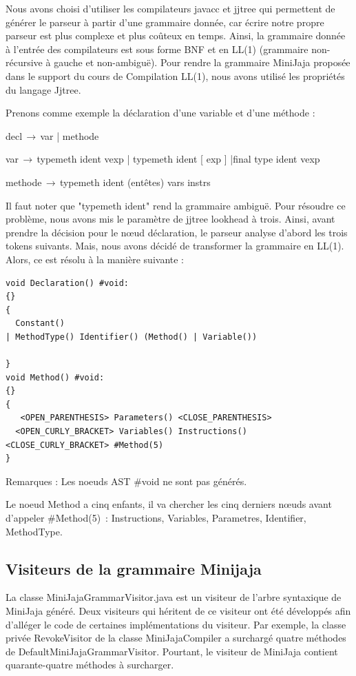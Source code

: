 \documentclass[a4paper,12pt]{report}
\begin{document}
Nous avons choisi d’utiliser les compilateurs javacc et jjtree qui permettent de générer le parseur à partir d'une grammaire donnée, car écrire notre propre parseur est plus complexe et plus coûteux en temps. Ainsi, la grammaire donnée à l’entrée des compilateurs est sous forme BNF et en LL(1) (grammaire non-récursive à gauche et non-ambiguë). Pour rendre la grammaire MiniJaja proposée dans le support du cours de Compilation LL(1), nous avons utilisé les propriétés du langage Jjtree. 

Prenons comme exemple la déclaration d'une variable et d'une méthode :

decl$\,\to\,$var  |  methode

var$\,\to\,$typemeth ident vexp | typemeth ident [ exp ] |final type ident vexp

methode$\,\to\,$typemeth ident (entêtes) { vars instrs }

Il faut noter que "typemeth ident" rend la grammaire ambiguë. Pour résoudre ce problème,  nous avons mis le paramètre de jjtree lookhead à trois. Ainsi, avant prendre la décision pour le nœud déclaration, le parseur analyse d'abord les trois tokens suivants. Mais, nous avons décidé de transformer la grammaire en LL(1). Alors, ce est résolu à la manière suivante : 
 
\lstset{language=Java}
\begin{lstlisting}
void Declaration() #void: 
{}
{
  Constant()
| MethodType() Identifier() (Method() | Variable())

}
void Method() #void: 
{}
{
   <OPEN_PARENTHESIS> Parameters() <CLOSE_PARENTHESIS>
  <OPEN_CURLY_BRACKET> Variables() Instructions()  <CLOSE_CURLY_BRACKET> #Method(5)
}  
\end{lstlisting}

Remarques :
Les noeuds AST \#void ne sont pas générés.

Le noeud Method a cinq enfants, il va chercher les cinq derniers nœuds avant d'appeler \#Method(5)~: Instructions, Variables, Parametres, Identifier, MethodType.

\subsection{Visiteurs de la grammaire Minijaja }
La classe MiniJajaGrammarVisitor.java est un visiteur de l’arbre syntaxique de MiniJaja généré. Deux visiteurs qui héritent de ce visiteur ont été développés afin d'alléger le code de certaines implémentations du visiteur. Par exemple, la classe privée RevokeVisitor de la classe MiniJajaCompiler a surchargé quatre méthodes de DefaultMiniJajaGrammarVisitor. Pourtant, le visiteur de MiniJaja contient quarante-quatre méthodes à surcharger.     
\end{document}
